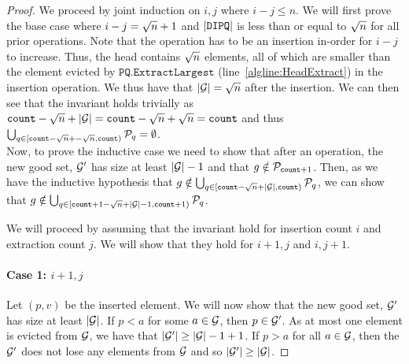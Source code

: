 \begin{proof}
We proceed by joint induction on $i, j$ where $i - j \leq n$. 
We will first prove the base case where $i - j = {\sqrt{n}} + 1$ and $|\texttt{DIPQ}|$ is less than or equal to ${\sqrt{n}}$ for all prior operations.
Note that the operation has to be an insertion in-order for $i - j$ to increase. Thus, the head contains ${\sqrt{n}}$ elements, all of which are smaller than the element evicted by $\texttt{PQ.ExtractLargest}$ (line~\ref{algline:HeadExtract}) in the insertion operation.
We thus have that $|\mathcal{G}| = {\sqrt{n}}$ after the insertion. 
We can then see that the invariant holds trivially as ${\texttt{count}} - {\sqrt{n}} + |\mathcal{G}| = {\texttt{count}} - {\sqrt{n}} + {\sqrt{n}} = {\texttt{count}}$ and thus
$\bigcup_{q \in [{\texttt{count}} - {\sqrt{n}} + -{\sqrt{n}}, {\texttt{count}})} \mathcal{P}_q = \emptyset$.\\

Now, to prove the inductive case we need to show that after an operation, the new good set, $\mathcal{G}'$ has size
at least $|\mathcal{G}| - 1$ and that $g \notin \mathcal{P}_{{\texttt{count}} + 1}$. Then, as we have the inductive hypothesis
that $g \notin \bigcup_{q \in [{\texttt{count}} - {\sqrt{n}} + |\mathcal{G}|, {\texttt{count}})} \mathcal{P}_q$, 
we can show that $g \notin \bigcup_{q \in [{\texttt{count}} + 1 - {\sqrt{n}} + |\mathcal{G}| - 1, {\texttt{count}} + 1)} \mathcal{P}_q$.

We will proceed by assuming that the invariant hold for insertion count $i$ and extraction count $j$. We will show that they hold for $i + 1, j$ and $i, j + 1$.
\paragraph*{Case 1: $i + 1, j$}
\label{proof:case1}
Let $(p, v)$ be the inserted element. We will now show that the new good set, $\mathcal{G}'$
has size at least $|\mathcal{G}|$.
If $p < a$ for some $a \in \mathcal{G}$, then $p \in \mathcal{G}'$. As at most one element is evicted from $\mathcal{G}$,
we have that $|\mathcal{G}'| \geq |\mathcal{G}| - 1 + 1$. If $p > a$ for all $a \in \mathcal{G}$, then the $\mathcal{G}'$ does not lose any elements from $\mathcal{G}$ and so
$|\mathcal{G}'| \geq |\mathcal{G}|$.


\end{proof}
